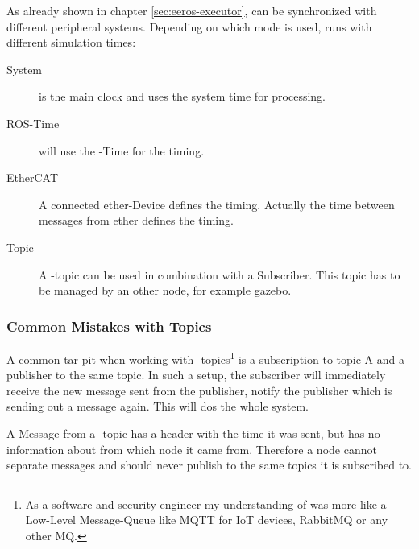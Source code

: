 As already shown in chapter \ref{sec:eeros-executor},  can be synchronized with different peripheral systems.
Depending on which mode is used,  runs with different simulation times:

\begin{description}
    \item[System]  is the main clock and uses the system time for processing.
    \item[ROS-Time]  will use the -Time for the timing.
    \item[EtherCAT] A connected \Gls{ether}-Device defines the timing.
    Actually the time between messages from \Gls{ether} defines the timing.
    \item[Topic] A -\Gls{topic} can be used in combination with a Subscriber.
    This \gls{topic} has to be managed by an other node, for example \Gls{gazebo}.
\end{description}



\subsubsection[Mistakes]{Common Mistakes with Topics} \label{sec:ros-common-mistakes}

A common tar-pit when working with -\Glspl{topic}\footnote{As a software and security engineer my understanding of  was more like a Low-Level Message-Queue like MQTT for IoT devices, RabbitMQ or any other MQ.} is a subscription to \gls{topic}-A and a publisher to the same \gls{topic}.
In such a setup, the subscriber will immediately receive the new message sent from the publisher, notify the publisher which is sending out a message again.
This will \gls{dos} the whole system.

A Message from a -\Gls{topic} has a header with the time it was sent, but has no information about from which \Gls{node} it came from.
Therefore a node cannot separate messages and should never publish to the same topics it is subscribed to.

